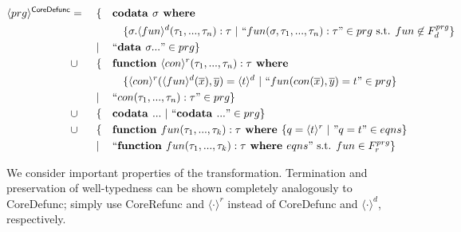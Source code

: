 \begin{algorithm}

\begin{align*}
\langle prg \rangle^{\textsf{CoreDefunc}} & = ~&& \{ && \textrm{\textbf{codata }} \sigma \textrm{\textbf{ where }} \span\span\span\span \\
& && && && \{ \sigma.\langle fun \rangle^d (\tau_1, ..., \tau_n): \tau ~ | ~ `` fun(\sigma, \tau_1, ..., \tau_n): \tau " \in prg \text{ s.t. } fun \not\in F^{prg}_d \} \\
& && | && `` \textrm{\textbf{data }} \sigma ... " \in prg \} \span\span\span\span \\
& \cup && \{ && \textrm{\textbf{function }} \langle con \rangle^r (\tau_1, ..., \tau_n): \tau \textrm{\textbf{ where}} \span\span\span\span \\
& && && && \{ \langle con \rangle^r (\langle fun \rangle^d (\overline{x}), \overline{y}) = \langle t \rangle^d ~ | ~ `` fun(con(\overline{x}), \overline{y}) = t " \in prg \} \\
& && | && `` con(\tau_1, ..., \tau_n): \tau " \in prg \} \span\span\span\span \\
& \cup && \{ && \textrm{\textbf{codata }} ... ~ | ~ `` \textrm{\textbf{codata }} ... " \in prg \} \span\span\span\span \\
& \cup && \{ && \textrm{\textbf{function }} fun(\tau_1, ..., \tau_k): \tau \textrm{\textbf{ where }} \{ q = \langle t \rangle^r ~ | ~ "q = t" \in eqns \} \span\span\span\span \\
& && | && `` \textrm{\textbf{function }} fun(\tau_1, ..., \tau_k): \tau \textrm{\textbf{ where }} eqns " \text{ s.t. } fun \in F^{prg}_r \} \span\span\span\span
\end{align*}

\end{algorithm}

We consider important properties of the transformation. Termination and preservation of well-typedness can be shown completely analogously to \textsf{CoreDefunc}; simply use \textsf{CoreRefunc} and $\langle \cdot \rangle^r$ instead of \textsf{CoreDefunc} and $\langle \cdot \rangle^d$, respectively.

